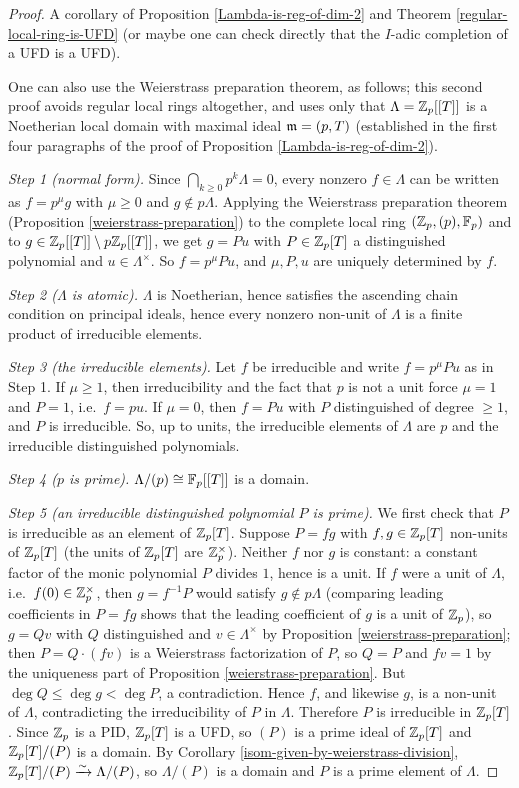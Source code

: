 \begin{proof}
\leanok
A corollary of Proposition \ref{Lambda-is-reg-of-dim-2} and
Theorem \ref{regular-local-ring-is-UFD}
(or maybe one can check directly that the $I$-adic completion of a UFD is a UFD).

One can also use the Weierstrass preparation theorem, as follows; this second
proof avoids regular local rings altogether, and uses only that
$\Lambda={\mathbb {Z}}_p[[T]]$ is a Noetherian local domain with maximal ideal ${\mathfrak{m}}=(p,T)$
(established in the first four paragraphs of the proof of
Proposition \ref{Lambda-is-reg-of-dim-2}).

\emph{Step 1 (normal form).}
Since $\bigcap_{k\geq 0}p^k\Lambda=0$, every nonzero $f\in\Lambda$ can be written
as $f=p^\mu g$ with $\mu\geq 0$ and $g\notin p\Lambda$.
Applying the Weierstrass preparation theorem
(Proposition \ref{weierstrass-preparation}) to the complete local ring
$({\mathbb {Z}}_p,(p),{\mathbb {F}}_p)$ and to $g\in{\mathbb {Z}}_p[[T]]\setminus p{\mathbb {Z}}_p[[T]]$, we get
$g=Pu$ with $P\in{\mathbb {Z}}_p[T]$ a distinguished polynomial and $u\in\Lambda^\times$.
So $f=p^\mu Pu$, and $\mu,P,u$ are uniquely determined by $f$.

\emph{Step 2 ($\Lambda$ is atomic).}
$\Lambda$ is Noetherian, hence satisfies the ascending chain condition on
principal ideals, hence every nonzero non-unit of $\Lambda$ is a finite product
of irreducible elements.

\emph{Step 3 (the irreducible elements).}
Let $f$ be irreducible and write $f=p^\mu Pu$ as in Step 1.
If $\mu\geq 1$, then irreducibility and the fact that $p$ is not a unit force
$\mu=1$ and $P=1$, i.e.~$f=pu$.
If $\mu=0$, then $f=Pu$ with $P$ distinguished of degree $\geq 1$, and $P$ is
irreducible. So, up to units, the irreducible elements of $\Lambda$ are $p$ and
the irreducible distinguished polynomials.

\emph{Step 4 ($p$ is prime).}
$\Lambda/(p)\cong{\mathbb {F}}_p[[T]]$ is a domain.

\emph{Step 5 (an irreducible distinguished polynomial $P$ is prime).}
We first check that $P$ is irreducible as an element of ${\mathbb {Z}}_p[T]$.
Suppose $P=fg$ with $f,g\in{\mathbb {Z}}_p[T]$ non-units of ${\mathbb {Z}}_p[T]$
(the units of ${\mathbb {Z}}_p[T]$ are ${\mathbb {Z}}_p^\times$).
Neither $f$ nor $g$ is constant: a constant factor of the monic polynomial $P$
divides $1$, hence is a unit.
If $f$ were a unit of $\Lambda$, i.e.~$f(0)\in{\mathbb {Z}}_p^\times$, then $g=f^{-1}P$
would satisfy $g\notin p\Lambda$ (comparing leading coefficients in $P=fg$
shows that the leading coefficient of $g$ is a unit of ${\mathbb {Z}}_p$), so $g=Qv$ with $Q$ distinguished and
$v\in\Lambda^\times$ by Proposition \ref{weierstrass-preparation}; then
$P=Q\cdot(fv)$ is a Weierstrass factorization of $P$, so $Q=P$ and $fv=1$ by the
uniqueness part of Proposition \ref{weierstrass-preparation}.
But $\deg Q\leq\deg g<\deg P$, a contradiction.
Hence $f$, and likewise $g$, is a non-unit of $\Lambda$, contradicting the
irreducibility of $P$ in $\Lambda$.
Therefore $P$ is irreducible in ${\mathbb {Z}}_p[T]$.
Since ${\mathbb {Z}}_p$ is a PID, ${\mathbb {Z}}_p[T]$ is a UFD, so $(P)$ is a prime ideal of
${\mathbb {Z}}_p[T]$ and ${\mathbb {Z}}_p[T]/(P)$ is a domain.
By Corollary \ref{isom-given-by-weierstrass-division},
${\mathbb {Z}}_p[T]/(P)\xrightarrow\sim\Lambda/(P)$, so $\Lambda/(P)$ is a domain and $P$
is a prime element of $\Lambda$.


\end{proof}
